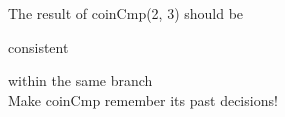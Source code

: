 \documentclass[preview]{standalone}
\begin{document}
\begin{center}
The result of coinCmp(2, 3) should be consistent within the same branch\\Make coinCmp remember its past decisions!
\end{center}
\end{document}
